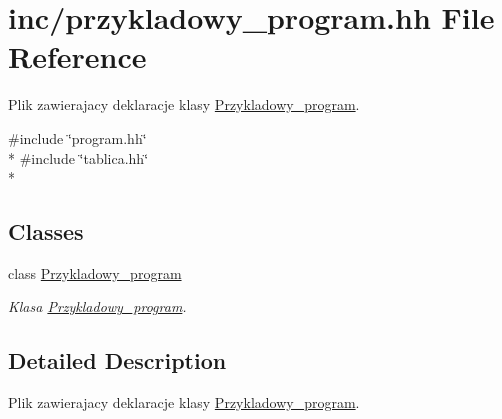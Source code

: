 \hypertarget{przykladowy__program_8hh}{\section{inc/przykladowy\-\_\-program.hh File Reference}
\label{przykladowy__program_8hh}
}


Plik zawierajacy deklaracje klasy \hyperlink{class_przykladowy__program}{Przykladowy\-\_\-program}.  


{\ttfamily \#include \char`\"{}program.\-hh\char`\"{}}\\*
{\ttfamily \#include \char`\"{}tablica.\-hh\char`\"{}}\\*
\subsection*{Classes}
\begin{DoxyCompactItemize}
\item 
class \hyperlink{class_przykladowy__program}{Przykladowy\-\_\-program}
\begin{DoxyCompactList}\small\item\em Klasa \hyperlink{class_przykladowy__program}{Przykladowy\-\_\-program}. \end{DoxyCompactList}\end{DoxyCompactItemize}


\subsection{Detailed Description}
Plik zawierajacy deklaracje klasy \hyperlink{class_przykladowy__program}{Przykladowy\-\_\-program}. 